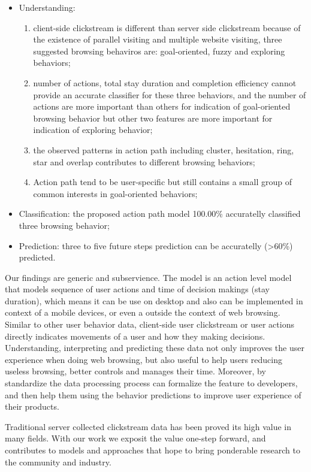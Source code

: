 \begin{itemize}
    \item Understanding: 
        \begin{enumerate}
            \item client-side clickstream is different than server side clickstream because of the existence of
            parallel visiting and multiple website visiting, three suggested browsing behaviros are: goal-oriented, fuzzy and exploring behaviors;
            \item number of actions, total stay duration and completion efficiency cannot provide an accurate classifier for these three behaviors, 
            and the number of actions are more important than others for indication of goal-oriented browsing behavior but other two features are more important for indication of exploring behavior;
            \item the observed patterns in action path including cluster, hesitation, ring, star and overlap contributes to different browsing behaviors;
            \item Action path tend to be user-specific but still contains a small group of common interests in goal-oriented behaviors;
        \end{enumerate}
    \item Classification: the proposed action path model 100.00\% accuratelly classified three browsing behavior;
    \item Prediction: three to five future steps prediction can be accuratelly (>60\%) predicted.
\end{itemize}

Our findings are generic and subservience. The model is an action level model that models
sequence of user actions and time of decision makings (stay duration), which means it
can be use on desktop and also can be implemented in context of a mobile devices, 
or even a outside the context of web browsing.
Similar to other user behavior data, client-side user clickstream or user actions 
directly indicates movements of a user and how they making decisions. Understanding, 
interpreting and predicting these data not only improves the user experience when doing
web browsing, but also useful to help users reducing useless browsing, better controls 
and manages their time. Moreover, by standardize the data processing process can formalize
the feature to developers, and then help them using the behavior predictions to
improve user experience of their products.

Traditional server collected clickstream data has been proved its high value in many 
fields. With our work we exposit the value one-step forward, and contributes to models 
and approaches that hope to bring ponderable research to the community and industry.

\cleardoublepage